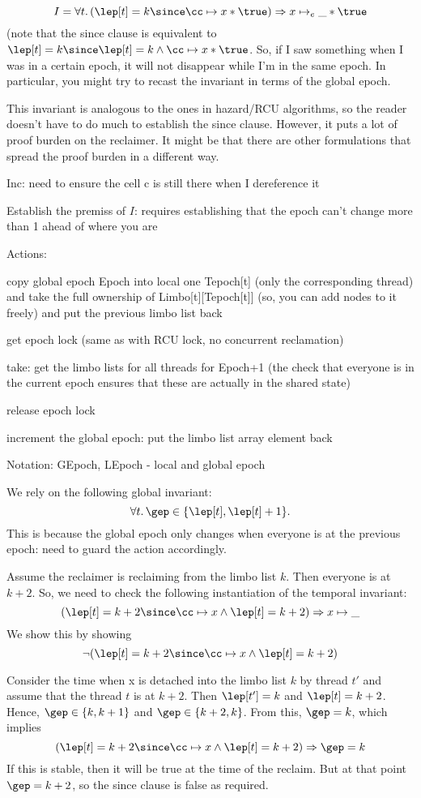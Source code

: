 $$
I = \forall t.\, (\lep[t] = k \since \cc \mapsto x * \true) \Rightarrow x \mapsto_e \_* \true
$$
(note that the since clause is equivalent to $\lep[t] = k \since \lep[t] = k
\wedge \cc \mapsto x * \true$. So, if I saw something when I was in a certain
epoch, it will not disappear while I'm in the same epoch. In particular, you
might try to recast the invariant in terms of the global epoch.

This invariant is analogous to the ones in hazard/RCU algorithms, so the reader
doesn't have to do much to establish the since clause. However, it puts a lot of
proof burden on the reclaimer. It might be that there are other formulations
that spread the proof burden in a different way.

Inc: need to ensure the cell c is still there when I dereference it

Establish the premiss of $I$: requires establishing that the epoch can't change
more than 1 ahead of where you are

Actions:

copy global epoch Epoch into local one Tepoch[t] (only the corresponding thread) and take the
full ownership of Limbo[t][Tepoch[t]] (so, you can add nodes to it freely) and
put the previous limbo list back

get epoch lock (same as with RCU lock, no concurrent reclamation)

take: get the limbo lists for all threads for Epoch+1 (the check that everyone
is in the current epoch ensures that these are actually in the shared state)

release epoch lock

increment the global epoch: put the limbo list array element back

Notation: GEpoch, LEpoch - local and global epoch

We rely on the following global invariant:
$$
\forall t.\, \gep \in \{\lep[t], \lep[t]+1\}.
$$
This is because the global epoch only changes when everyone is at the previous
epoch: need to guard the action accordingly.

Assume the reclaimer is reclaiming from the limbo list $k$. Then everyone is at
$k+2$. So, we need to check the following instantiation of the temporal
invariant:
$$
(\lep[t] = k+2 \since \cc \mapsto x \wedge \lep[t] = k+2) \Rightarrow x \mapsto \_
$$
We show this by showing
$$
\neg (\lep[t] = k+2 \since \cc \mapsto x \wedge \lep[t] = k+2)
$$

Consider the time when x is detached into the limbo list $k$ by thread $t'$ and
assume that the thread $t$ is at $k+2$. Then $\lep[t'] = k$ and $\lep[t] =
k+2$. Hence, $\gep \in \{k, k+1\}$ and $\gep \in \{k+2, k\}$. From this, $\gep = k$,
which implies
$$
(\lep[t] = k+2 \since \cc \mapsto x \wedge \lep[t] = k+2) \Rightarrow \gep = k
$$
If this is stable, then it will be true at the time of the reclaim. But at that
point $\gep = k+2$, so the since clause is false as required.


